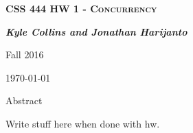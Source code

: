 \documentclass[letterpaper,10pt,draftclsnofoot,titlepage,onecolumn]{IEEEtran}
\begin{document}
	
	\begin{titlepage}
		\centering
		{\scshape\LARGE \textbf{CSS 444 HW 1 - Concurrency}\par}
		{\LARGE\itshape \textbf{Kyle Collins and Jonathan Harijanto}\par}
		{\LARGE Fall 2016\par}
		{\LARGE \today\par}
		
		{\LARGE Abstract\par}
		Write stuff here when done with hw. 
		
	\end{titlepage}
	
	\clearpage
	\tableofcontents
	
	
	\clearpage
\end{document}
